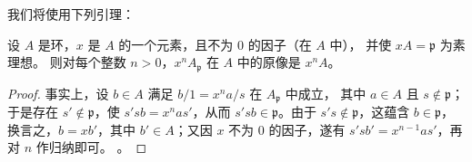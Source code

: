 我们将使用下列引理：

\begin{lemma}[23.1.3.1]
\label{0.23.1.3.1-fr}
设 $A$ 是环，$x$ 是 $A$ 的一个元素，且不为 $0$ 的因子（在 $A$ 中），
并使 $xA=\mathfrak p$ 为素理想。
则对每个整数 $n>0$，$x^nA_{\mathfrak p}$ 在 $A$ 中的原像是 $x^nA$。
\end{lemma}

\begin{proof}
事实上，设 $b\in A$ 满足 $b/1=x^na/s$ 在 $A_{\mathfrak p}$ 中成立，
其中 $a\in A$ 且 $s\notin\mathfrak p$；于是存在
$s'\notin\mathfrak p$，使 $s'sb=x^nas'$，从而
$s'sb\in\mathfrak p$。由于 $s's\notin\mathfrak p$，这蕴含
$b\in\mathfrak p$，换言之，$b=xb'$，其中 $b'\in A$；又因 $x$ 不为
$0$ 的因子，遂有 $s'sb'=x^{n-1}as'$，再对 $n$ 作归纳即可。
。
\end{proof}

